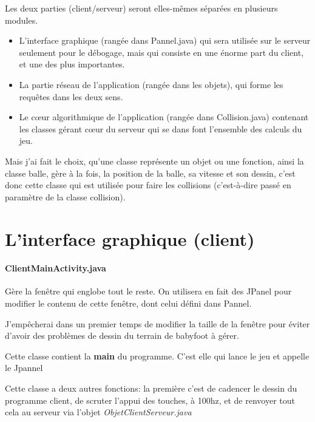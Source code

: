 \documentclass[a4paper,12pt]{report}
\begin{document}
Les deux parties (client/serveur) seront elles-mêmes séparées en plusieurs modules.

\begin{itemize}

\item L'interface graphique (rangée dans Pannel.java) qui sera utilisée sur le serveur seulement pour le débogage, mais qui consiste en une énorme part du client, et une des plus importantes.

\item La partie réseau de l'application (rangée dans les objets), qui forme les requêtes dans les deux sens.

\item Le c\oe{}ur algorithmique de l'application (rangée dans Collision.java) contenant les classes gérant c\oe{}ur du serveur qui se dans font l'ensemble des calculs du jeu.

\end{itemize}

Mais j'ai fait le choix, qu'une classe représente un objet ou une fonction, ainsi la classe balle, gère à la fois, la position de la balle, sa vitesse et son dessin, c'est donc cette classe qui est utilisée pour faire les collisions (c'est-à-dire passé en paramètre de la classe collision).




\section{L'interface graphique (client)}

\paragraph{ClientMainActivity.java}

Gère la fenêtre qui englobe tout le reste. On utilisera en fait des JPanel pour modifier le contenu de cette fenêtre, dont celui défini dans Pannel. 

J'empêcherai dans un premier temps de modifier la taille de la fenêtre pour éviter d'avoir des problèmes de dessin du terrain de babyfoot à gérer.

Cette classe contient la \textbf{main} du programme. C'est elle qui lance le jeu et appelle le Jpannel

Cette classe a deux autres fonctions: la première c'est de cadencer le dessin du programme client, de scruter l'appui des touches, à 100hz, et de renvoyer tout cela au serveur via l'objet \emph{ObjetClientServeur.java}
\end{document}
